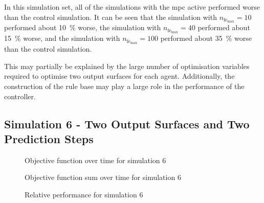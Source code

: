 \documentclass[conference]{IEEEtran}
\begin{document}

In this simulation set, all of the simulations with the \gls{mpc} active performed worse than the control simulation.
It can be seen that the simulation with $n_{\text{fe}_{\text{max}}} = 10$ performed about \SI{10}{\percent} worse, the simulation with $n_{\text{fe}_{\text{max}}} = 40$ performed about \SI{15}{\percent} worse, and the simulation with $n_{\text{fe}_{\text{max}}} = 100$ performed about \SI{35}{\percent} worse than the control simulation.

This may partially be explained by the large number of optimisation variables required to optimise two output surfaces for each agent.
Additionally, the construction of the rule base may play a large role in the performance of the controller.

\subsection{Simulation 6 - Two Output Surfaces and Two Prediction Steps} \label{subsec:results_SS06}

\begin{figure}[h]
    \centering
    
    \caption{Objective function over time for simulation 6}
    \label{fig:SS06_obj_hist}
\end{figure}

%     

\begin{figure}[h]
    \centering
    
    \caption{Objective function sum over time for simulation 6}
    \label{fig:SS06_s_obj_hist}
\end{figure}

\begin{figure}[h]
    \centering
    
    \caption{Relative performance for simulation 6}
    \label{fig:SS06_s_obj_rel}
\end{figure}
\end{document}

